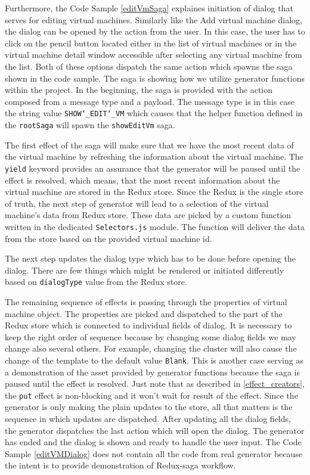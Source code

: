Furthermore, the Code Sample \ref{editVmSaga} explaines initiation of dialog that serves for editing virtual machines. Similarly like the Add virtual machine dialog, the dialog can be opened by the action from the user. In this case, the user has to click on the pencil button located either in the list of virtual machines or in the virtual machine detail window accessible after selecting any virtual machine from the list. Both of these options dispatch the same action which spawns the saga shown in the code sample. The saga is showing how we utilize generator functions within the project. In the beginning, the saga is provided with the action composed from a message type and a payload. The message type is in this case the string value \texttt{SHOW\char`_EDIT\char`_VM} which causes that the helper function defined in the \texttt{rootSaga} will spawn the \texttt{showEditVm} saga. 

The first effect of the saga will make sure that we have the most recent data of the virtual machine by refreshing the information about the virtual machine. The \texttt{yield} keyword provides an assurance that the generator will be paused until the effect is resolved, which means, that the most recent information about the virtual machine are stored in the Redux store. Since the Redux is the single store of truth, the next step of generator will lead to a selection of the virtual machine's data from Redux store. These data are picked by a custom function written in the dedicated \texttt{Selectors.js} module. The function will deliver the data from the store based on the provided virtual machine id.

The next step updates the dialog type which has to be done before opening the dialog. There are few things which might be rendered or initiated differently based on \texttt{dialogType} value from the Redux store.

The remaining sequence of effects is passing through the properties of virtual machine object. The properties are picked and dispatched to the part of the Redux store which is connected to individual fields of dialog. It is necessary to keep the right order of sequence because by changing some dialog fields we may change also several others. For example, changing the cluster will also cause the change of the template to the default value \texttt{Blank}. This is another case serving as a demonstration of the asset provided by generator functions because the saga is paused until the effect is resolved. Just note that as described in \ref{effect_creators}, the \texttt{put} effect is non-blocking and it won't wait for result of the effect. Since the generator is only making the plain updates to the store, all that matters is the sequence in which updates are dispatched. After updating all the dialog fields, the generator dispatches the last action which will open the dialog. The generator has ended and the dialog is shown and ready to handle the user input. The Code Sample \ref{editVMDialog} does not contain all the code from real generator because the intent is to provide demonstration of Redux-saga workflow.


